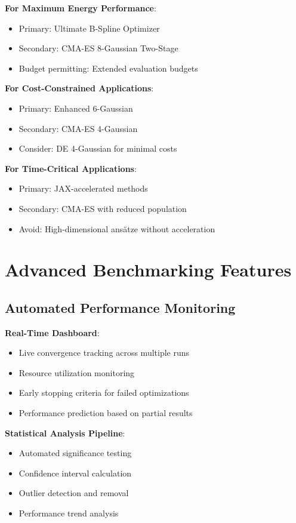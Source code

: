 \documentclass[11pt,a4paper]{article}
\begin{document}
\textbf{For Maximum Energy Performance}:
\begin{itemize}
\item Primary: Ultimate B-Spline Optimizer
\item Secondary: CMA-ES 8-Gaussian Two-Stage
\item Budget permitting: Extended evaluation budgets
\end{itemize}

\textbf{For Cost-Constrained Applications}:
\begin{itemize}
\item Primary: Enhanced 6-Gaussian
\item Secondary: CMA-ES 4-Gaussian
\item Consider: DE 4-Gaussian for minimal costs
\end{itemize}

\textbf{For Time-Critical Applications}:
\begin{itemize}
\item Primary: JAX-accelerated methods
\item Secondary: CMA-ES with reduced population
\item Avoid: High-dimensional ansätze without acceleration
\end{itemize}

\section{Advanced Benchmarking Features}

\subsection{Automated Performance Monitoring}

\textbf{Real-Time Dashboard}:
\begin{itemize}
\item Live convergence tracking across multiple runs
\item Resource utilization monitoring
\item Early stopping criteria for failed optimizations
\item Performance prediction based on partial results
\end{itemize}

\textbf{Statistical Analysis Pipeline}:
\begin{itemize}
\item Automated significance testing
\item Confidence interval calculation
\item Outlier detection and removal
\item Performance trend analysis
\end{itemize}
\end{document}
